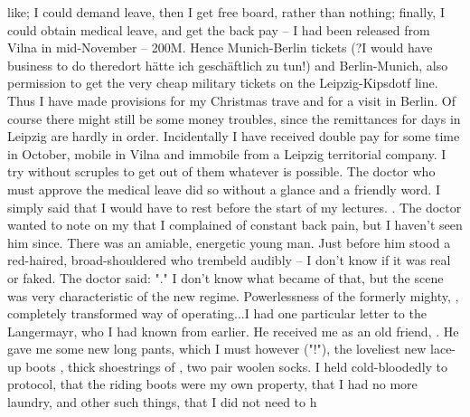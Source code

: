 like; I could demand leave, then I get free board, rather than nothing; finally, I could obtain medical leave, and get the back pay -- I had been released from Vilna in mid-November -- 200M. Hence Munich-Berlin tickets (?{I would have business to do there}{dort hätte ich geschäftlich zu tun}!) and Berlin-Munich, also permission to get the very cheap military tickets on the Leipzig-Kipsdotf line. Thus I have made provisions for my Christmas trave and for a visit in Berlin. Of course there might still be some money troubles, since the remittances for days in Leipzig are hardly in order. Incidentally I have received double pay for some time in October, mobile in Vilna and immobile from a Leipzig territorial company. I try without scruples to get out of them whatever is possible. The doctor who must approve the medical leave did so without a glance and a friendly word. I simply said that I would have to rest before the start of my lectures. . The doctor wanted to note on my  that I complained of constant back pain, but I haven't seen him since. There was an amiable, energetic young man. Just before him stood a red-haired, broad-shouldered  who trembeld audibly -- I don't know if it was real or faked. The doctor said: "." I don't know what became of that, but the scene was very characteristic of the new regime. Powerlessness of the formerly mighty, , completely transformed way of operating...I had  one particular letter to the  Langermayr, who I had known from earlier. He received me as an old friend, . He gave me some new long pants, which I must however  ("!"), the loveliest new lace-up boots , thick shoestrings of , two pair woolen socks. I held cold-bloodedly to protocol, that the riding boots were my own property, that I had no more laundry, and other such things, that I did not need to h
